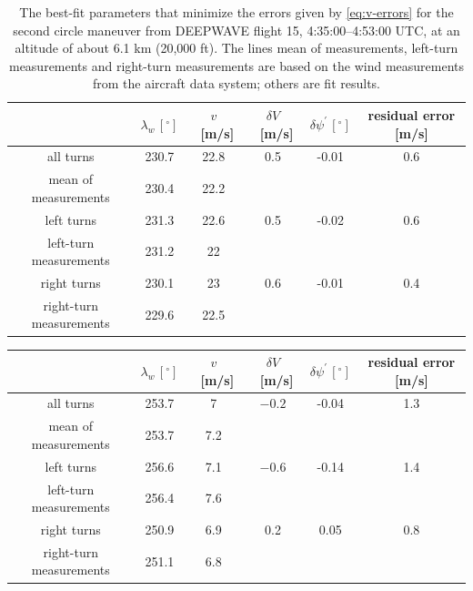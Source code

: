 \documentclass[12pt,twoside,english]{article}\usepackage[]{graphicx}\usepackage[]{color}
\providecommand{\tabularnewline}{\\}
\begin{document}
{{\begin{center}
\begin{table}[H] 
\begin{centering}
\begin{tabular}{cccccc}
\toprule%
 & $\lambda_w\,[^{\circ}]$  & $v$~{[}m/s{]}  & $\delta V$~{[}m/s{]}  & $\delta\psi^{\prime}\,[^{\circ}]$  & residual error {[}m/s{]}\tabularnewline 
\midrule 
\midrule  all turns & 230.7 & 22.8 & 0.5 & -0.01 & 0.6\tabularnewline 
\midrule  mean of measurements & 230.4 & 22.2 &  &  & \tabularnewline 
\midrule  left turns & 231.3 & 22.6 & 0.5 & -0.02 & 0.6\tabularnewline 
\midrule  left-turn measurements & 231.2 & 22 &  & & \tabularnewline 
\midrule  right turns & 230.1 & 23 & 0.6 & -0.01 & 0.4\tabularnewline 
\midrule  right-turn measurements & 229.6 & 22.5 &  & & \tabularnewline 
\bottomrule 
\end{tabular}
\par\end{centering}

\protect\caption[The best-fit parameters that minimize the errors given by \eqref{eq:v-errors} for the second circle maneuver from DEEPWAVE flight 15.]{The best-fit parameters that minimize the errors given by \eqref{eq:v-errors} for the second circle maneuver from DEEPWAVE flight 15, 4:35:00--4:53:00 UTC, at an altitude of about 6.1 km (20,000 ft). The lines \textquotedbl{}mean of measurements\textquotedbl{}, \textquotedbl{}left-turn measurements\textquotedbl{} and \textquotedbl{}right-turn measurements\textquotedbl{} are based on the wind measurements from the aircraft data system; others are fit results.\label{tab:GS2min}}
\end{table}

\par\end{center}



\begin{center}
\begin{table}[H] 
\begin{centering}
\begin{tabular}{cccccc}
\toprule   & $\lambda_w\,[^{\circ}]$  & $v$~{[}m/s{]}  & $\delta V$~{[}m/s{]}  & $\delta\psi^{\prime}\,[^{\circ}]$  & residual error {[}m/s{]}\tabularnewline 
\midrule 
\midrule  all turns & 253.7 & 7 & \ensuremath{-0.2} & -0.04 & 1.3\tabularnewline 
\midrule  mean of measurements & 253.7 & 7.2 &  &  & \tabularnewline 
\midrule  left turns & 256.6 & 7.1 & \ensuremath{-0.6} & -0.14 & 1.4\tabularnewline 
\midrule  left-turn measurements & 256.4 & 7.6 &  & & \tabularnewline 
\midrule  right turns & 250.9 & 6.9 & 0.2 & 0.05 & 0.8\tabularnewline 
\midrule  right-turn measurements & 251.1 & 6.8 &  & & \tabularnewline 
\bottomrule 
\end{tabular}
\par\end{centering}


\end{table}
\end{center}}}
\end{document}
